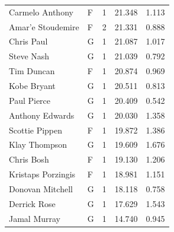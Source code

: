 \begin{table}[t]
\begin{tabular*}{\linewidth}{@{\extracolsep{\fill}}llcrr}
Carmelo Anthony & F & 1 & 21.348 & 1.113 \\ 
Amar'e Stoudemire & F & 2 & 21.331 & 0.888 \\ 
Chris Paul & G & 1 & 21.087 & 1.017 \\ 
Steve Nash & G & 1 & 21.039 & 0.792 \\ 
Tim Duncan & F & 1 & 20.874 & 0.969 \\ 
Kobe Bryant & G & 1 & 20.511 & 0.813 \\ 
Paul Pierce & G & 1 & 20.409 & 0.542 \\ 
Anthony Edwards & G & 1 & 20.030 & 1.358 \\ 
Scottie Pippen & F & 1 & 19.872 & 1.386 \\ 
Klay Thompson & G & 1 & 19.609 & 1.676 \\ 
Chris Bosh & F & 1 & 19.130 & 1.206 \\ 
Kristaps Porzingis & F & 1 & 18.981 & 1.151 \\ 
Donovan Mitchell & G & 1 & 18.118 & 0.758 \\ 
Derrick Rose & G & 1 & 17.629 & 1.543 \\ 
Jamal Murray & G & 1 & 14.740 & 0.945 \\ 
\bottomrule
\end{tabular*}
\end{table}

